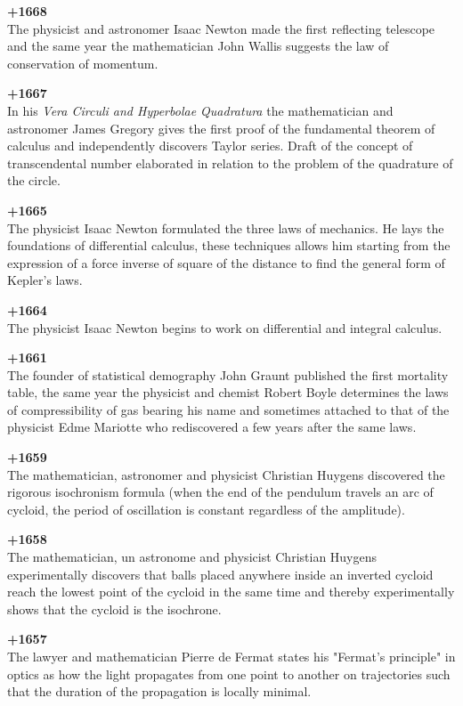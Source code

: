 \textbf{+1668}\\
The physicist and astronomer Isaac Newton made the first reflecting telescope and the same year the mathematician John Wallis suggests the law of conservation of momentum.

\textbf{+1667}\\
In his \textit{Vera Circuli and Hyperbolae Quadratura} the mathematician and astronomer James Gregory gives the first proof of the fundamental theorem of calculus and independently discovers Taylor series. Draft of the concept of transcendental number elaborated in relation to the problem of the quadrature of the circle.

\textbf{+1665}\\
The physicist Isaac Newton formulated the three laws of mechanics. He lays the foundations of differential calculus, these techniques allows him starting from the expression of a force inverse of square of the distance to find the general form of Kepler's laws.

\textbf{+1664}\\
The physicist Isaac Newton begins to work on differential and integral calculus.

\textbf{+1661}\\
The founder of statistical demography John Graunt published the first mortality table, the same year the physicist and chemist Robert Boyle determines the laws of compressibility of gas bearing his name and sometimes attached to that of the physicist Edme Mariotte who rediscovered a few years after the same laws.

\textbf{+1659}\\
The mathematician, astronomer and physicist Christian Huygens discovered the rigorous isochronism formula (when the end of the pendulum travels an arc of cycloid, the period of oscillation is constant regardless of the amplitude).

\textbf{+1658}\\
The mathematician, un astronome and physicist Christian Huygens experimentally discovers that balls placed anywhere inside an inverted cycloid reach the lowest point of the cycloid in the same time and thereby experimentally shows that the cycloid is the isochrone.

\textbf{+1657}\\
The lawyer and mathematician Pierre de Fermat states his "Fermat's principle" in optics as how the light propagates from one point to another on trajectories such that the duration of the propagation is locally minimal.


